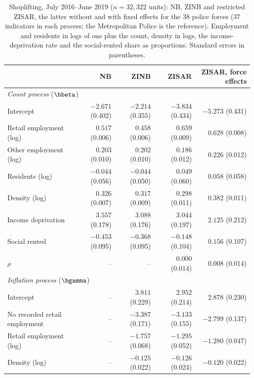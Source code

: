 \begin{table}[htbp]
\centering
\caption{Shoplifting, July 2016--June 2019 ($n = 32{,}322$ units): NB, ZINB and restricted ZISAR, the latter without and with fixed effects for the 38 police forces (37 indicators in each process; the Metropolitan Police is the reference). Employment and residents in logs of one plus the count, density in logs, the income-deprivation rate and the social-rented share as proportions. Standard errors in parentheses.}\label{tab:crime_estimates}
\footnotesize
\setlength{\tabcolsep}{4pt}
\begin{tabular}{lrrrr}
\toprule
 & NB & ZINB & ZISAR & ZISAR, force effects \\
\midrule
\multicolumn{5}{l}{\textit{Count process} ($\bbeta$)} \\
Intercept                      & $-2.671$ (0.402) & $-2.214$ (0.355) & $-3.834$ (0.434) & $-5.273$ (0.431) \\
Retail employment (log)        & $0.517$ (0.006)  & $0.458$ (0.006)  & $0.659$ (0.009)  & $0.628$ (0.008) \\
Other employment (log)         & $0.203$ (0.010)  & $0.202$ (0.010)  & $0.186$ (0.012)  & $0.226$ (0.012) \\
Residents (log)                & $-0.044$ (0.056) & $-0.044$ (0.050) & $0.049$ (0.060)  & $0.058$ (0.058) \\
Density (log)                  & $0.326$ (0.007)  & $0.317$ (0.009)  & $0.298$ (0.011)  & $0.382$ (0.011) \\
Income deprivation             & $3.557$ (0.178)  & $3.088$ (0.176)  & $3.044$ (0.197)  & $2.125$ (0.212) \\
Social rented                  & $-0.453$ (0.095) & $-0.368$ (0.095) & $-0.148$ (0.104) & $0.156$ (0.107) \\
$\rho$                         & --               & --               & $0.000$ (0.014)  & $0.008$ (0.014) \\
\midrule
\multicolumn{5}{l}{\textit{Inflation process} ($\bgamma$)} \\
Intercept                      & -- & $3.811$ (0.229)  & $2.952$ (0.214)  & $2.878$ (0.230) \\
No recorded retail employment  & -- & $-3.387$ (0.171) & $-3.133$ (0.155) & $-2.799$ (0.137) \\
Retail employment (log)        & -- & $-1.757$ (0.068) & $-1.295$ (0.052) & $-1.280$ (0.047) \\
Density (log)                  & -- & $-0.125$ (0.022) & $-0.126$ (0.024) & $-0.120$ (0.022) \\

\end{tabular}
\end{table}
